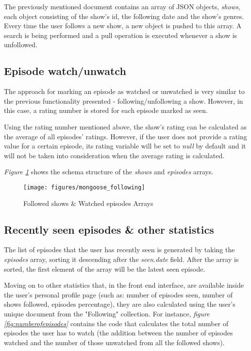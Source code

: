 The previously mentioned document contains an array of JSON objects, \textit{shows}, each object consisting of the show's id, the following date and the show's genres. Every time the user follows a new show, a new object is pushed to this array. A search is being performed and a pull operation is executed whenever a show is unfollowed.

\subsection{Episode watch/unwatch}

The approach for marking an episode as watched or unwatched is very similar to the previous functionality presented - following/unfollowing a show. However, in this case, a rating number is stored for each episode marked as seen.

Using the rating number mentioned above, the show's rating can be calculated as the average of all episodes' ratings. However, if the user does not provide a rating value for a certain episode, its rating variable will be set to \textit{null} by default and it will not be taken into consideration when the average rating is calculated.

\textit{Figure \ref{fig:following}} shows the schema structure of the \textit{shows} and \textit{episodes} arrays.

\begin{figure}[h]
\centering
\texttt{[image: figures/mongoose\_following]}
\caption{Followed shows \& Watched episodes Arrays}
\label{fig:following}
\end{figure}

\subsection{Recently seen episodes \& other statistics}

The list of episodes that the user has recently seen  is generated by taking the \textit{episodes} array, sorting it descending after the \textit{seen.date} field. After the array is sorted, the first element of the array will be the latest seen episode.

Moving on to other statistics that, in the front end interface, are available inside the user's personal profile page (such as: number of episodes seen, number of shows followed, episodes percentage), they are also calculated using the user's unique document from the "Following" collection. For instance, \textit{figure \ref{fig:numberofepisodes}} contains the code that calculates the total number of episodes the user has to watch (the addition between the number of episodes watched and the number of those unwatched from all the followed shows).

